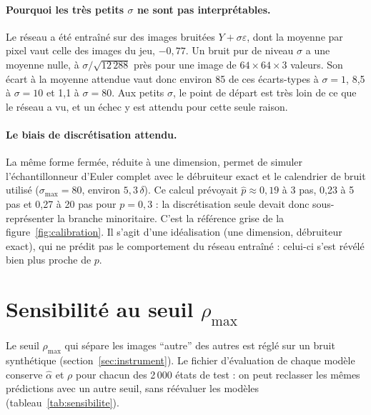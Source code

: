 \documentclass[a4paper, 11pt]{article}
\newcommand{\ahat}{\hat\alpha}
\newcommand{\phat}{\hat p}
\begin{document}
\paragraph{Pourquoi les très petits $\sigma$ ne sont pas interprétables.} Le réseau a été entraîné sur des images bruitées
$Y + \sigma\varepsilon$, dont la moyenne par pixel vaut celle des images du jeu, $-0{,}77$. Un bruit pur de niveau $\sigma$ a une
moyenne nulle, à $\sigma/\sqrt{12\,288}$ près pour une image de $64\times64\times3$ valeurs. Son écart à la moyenne attendue vaut
donc environ 85 de ces écarts-types à $\sigma = 1$, 8,5 à $\sigma = 10$ et 1,1 à $\sigma = 80$. Aux petits $\sigma$, le point de
départ est très loin de ce que le réseau a vu, et un échec y est attendu pour cette seule raison.

\paragraph{Le biais de discrétisation attendu.} La même forme fermée, réduite à une dimension, permet de simuler l'échantillonneur
d'Euler complet avec le débruiteur exact et le calendrier de bruit utilisé ($\sigma_{\max} = 80$, environ $5{,}3\,\delta$). Ce calcul
prévoyait $\phat \approx 0{,}19$ à 3 pas, 0,23 à 5 pas et 0,27 à 20 pas pour $p = 0{,}3$ : la discrétisation seule devait donc
sous-représenter la branche minoritaire. C'est la référence grise de la figure~\ref{fig:calibration}. Il s'agit d'une idéalisation
(une dimension, débruiteur exact), qui ne prédit pas le comportement du réseau entraîné : celui-ci s'est révélé bien plus proche de
$p$.

\section{Sensibilité au seuil $\rho_{\max}$}\label{app:sensibilite}

Le seuil $\rho_{\max}$ qui sépare les images \enquote{autre} des autres est réglé sur un bruit synthétique (section~\ref{sec:instrument}).
Le fichier d'évaluation de chaque modèle conserve $\ahat$ et $\rho$ pour chacun des 2\,000 états de test : on peut reclasser les mêmes prédictions avec un autre seuil, sans réévaluer les modèles (tableau~\ref{tab:sensibilite}).

\begin{table}[H]
  \centering\footnotesize
  
  \caption{Part des prédictions classées \enquote{autre} et \enquote{floue} (\%) selon le seuil, moyenne sur trois graines à $p = 0{,}3$.
  Le seuil retenu vaut 0,160.}
  \label{tab:sensibilite}
\end{table}
\end{document}
